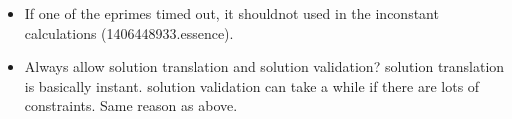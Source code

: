 \begin{itemize}
	\item If one of the eprimes timed out, it shouldnot  used in the inconstant calculations (1406448933.essence).
	\item Always allow solution translation and solution validation?  solution translation is basically instant. solution validation can take a while if there are lots of constraints.  Same reason as above. 

\end{itemize}





